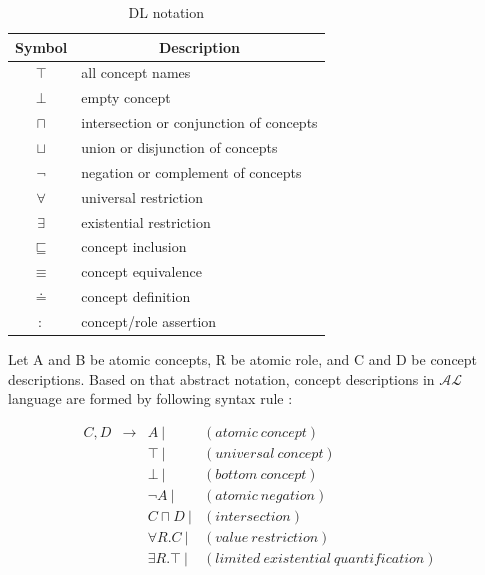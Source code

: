 \begin{table}[htp]
\centering
\begin{tabular}{ |c|l| }
    \hline
    \textbf{Symbol} & \multicolumn{1}{c|}{\textbf{Description}} \\ \hline
    $\top$          & all concept names \\ \hline
    $\bot$          & empty  concept \\ \hline
    $\sqcap$        & intersection or conjunction of concepts \\ \hline
    $\sqcup$        & union or disjunction of concepts \\ \hline
    $\lnot$         & negation  or complement of concepts \\ \hline
    $\forall$       & universal restriction \\ \hline
    $\exists$       & existential restriction \\ \hline
    $\sqsubseteq$   & concept inclusion \\ \hline
    $\equiv$        & concept equivalence \\ \hline
    $\doteq$        & concept definition \\ \hline
    $:$             & concept/role assertion \\ \hline
\end{tabular}
\caption{DL notation}
\end{table} 

\noindent Let A and B be atomic concepts, R be atomic role, and C and D be concept descriptions. Based on that abstract notation, concept descriptions in $\mathcal{AL}$ language are formed by following syntax rule \cite{BCM03}:

\smallskip

\[
\begin{array}{lcll} 
    C,D & \to   & A~|               & (atomic~ concept) \\ 
        & 		& \top~|            & (universal~ concept) \\
        & 		& \bot~|            & (bottom~ concept) \\
        &		& \lnot A~|         & (atomic~ negation) \\
        &		& C \sqcap D~|      & (intersection) \\
        &		& \forall R.C~|     & (value~ restriction) \\
        &		& \exists R.\top~|  & (limited~ existential~ quantification)
\end{array}
\]

